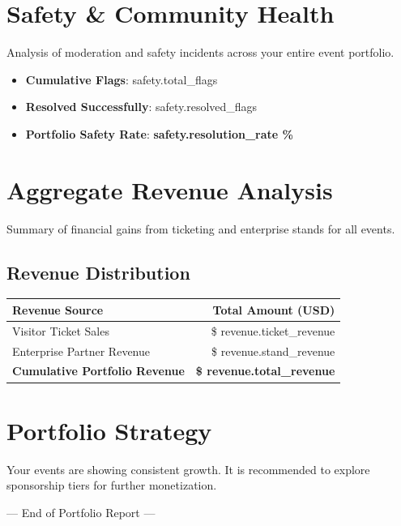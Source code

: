 \documentclass[a4paper,12pt]{article}
\begin{document}
\section{Safety & Community Health}
Analysis of moderation and safety incidents across your entire event portfolio.

\begin{tcolorbox}[colback=graybg, colframe=bordergray, title=Incident Management Summary]
    \begin{itemize}
        \item \textbf{Cumulative Flags}: {{ safety.total_flags }}
        \item \textbf{Resolved Successfully}: {{ safety.resolved_flags }}
        \item \textbf{Portfolio Safety Rate}: \color{success} \bfseries {{ safety.resolution_rate }}\%
    \end{itemize}
\end{tcolorbox}

\section{Aggregate Revenue Analysis}
Summary of financial gains from ticketing and enterprise stands for all events.

\subsection{Revenue Distribution}
\begin{table}[h]
    \centering
    \renewcommand{\arraystretch}{1.5}
    \begin{tabularx}{\textwidth}{X r}
        \rowcolor{primary!10}
        \textbf{Revenue Source} & \textbf{Total Amount (USD)} \\
        \midrule
        Visitor Ticket Sales & \${{ revenue.ticket_revenue }} \\
        Enterprise Partner Revenue & \${{ revenue.stand_revenue }} \\
        \midrule
        \rowcolor{success!10}
        \textbf{Cumulative Portfolio Revenue} & \textbf{\${{ revenue.total_revenue }} } \\
        \bottomrule
    \end{tabularx}
\end{table}

\section{Portfolio Strategy}
Your events are showing consistent growth. It is recommended to explore sponsorship tiers for further monetization.

\vspace{2cm}
\begin{center}
    \small \color{gray} --- End of Portfolio Report ---
\end{center}
\end{document}
